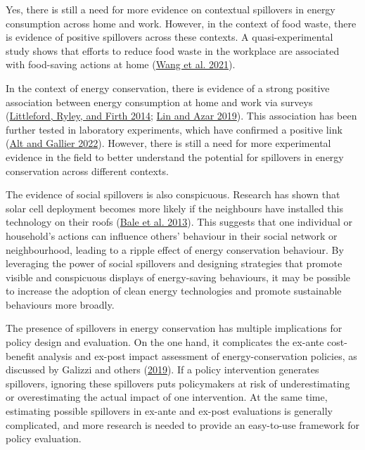 \documentclass[
  12pt,
  captions=heading]{scrreport}
\begin{document}
Yes, there is still a need for more evidence on contextual spillovers in
energy consumption across home and work. However, in the context of food
waste, there is evidence of positive spillovers across these contexts. A
quasi-experimental study shows that efforts to reduce food waste in the
workplace are associated with food-saving actions at home
(\protect\hyperlink{ref-wang2021take}{Wang et al. 2021}).

In the context of energy conservation, there is evidence of a strong
positive association between energy consumption at home and work via
surveys (\protect\hyperlink{ref-littleford2014context}{Littleford,
Ryley, and Firth 2014}; \protect\hyperlink{ref-lin2019mixing}{Lin and
Azar 2019}). This association has been further tested in laboratory
experiments, which have confirmed a positive link
(\protect\hyperlink{ref-alt2022incentives}{Alt and Gallier 2022}).
However, there is still a need for more experimental evidence in the
field to better understand the potential for spillovers in energy
conservation across different contexts.

The evidence of social spillovers is also conspicuous. Research has
shown that solar cell deployment becomes more likely if the neighbours
have installed this technology on their roofs
(\protect\hyperlink{ref-bale2013harnessing}{Bale et al. 2013}). This
suggests that one individual or household's actions can influence
others' behaviour in their social network or neighbourhood, leading to a
ripple effect of energy conservation behaviour. By leveraging the power
of social spillovers and designing strategies that promote visible and
conspicuous displays of energy-saving behaviours, it may be possible to
increase the adoption of clean energy technologies and promote
sustainable behaviours more broadly.

The presence of spillovers in energy conservation has multiple
implications for policy design and evaluation. On the one hand, it
complicates the ex-ante cost-benefit analysis and ex-post impact
assessment of energy-conservation policies, as discussed by Galizzi and
others (\protect\hyperlink{ref-galizzi2019measure}{2019}). If a policy
intervention generates spillovers, ignoring these spillovers puts
policymakers at risk of underestimating or overestimating the actual
impact of one intervention. At the same time, estimating possible
spillovers in ex-ante and ex-post evaluations is generally complicated,
and more research is needed to provide an easy-to-use framework for
policy evaluation.
\end{document}
